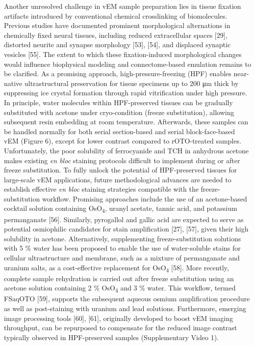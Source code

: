 \documentclass{article}
\begin{document}
Another unresolved challenge in vEM sample preparation lies in tissue fixation artifacts introduced by conventional chemical crosslinking of biomolecules. Previous studies have documented prominent morphological alternations in chemically fixed neural tissues, including reduced extracellular spaces [29], distorted neurite and synapse morphology [53], [54], and displaced synaptic vesicles [55]. The extent to which these fixation-induced morphological changes would influence biophysical modeling and connectome-based emulation remains to be clarified. As a promising approach, high-pressure-freezing (HPF) enables near-native ultrastructural preservation for tissue specimens up to 200 μm thick by suppressing ice crystal formation through rapid vitrification under high pressure. In principle, water molecules within HPF-preserved tissues can be gradually substituted with acetone under cryo-condition (freeze substitution), allowing subsequent resin embedding at room temperature. Afterwards, these samples can be handled normally for both serial section-based and serial block-face-based vEM (Figure 6), except for lower contrast compared to rOTO-treated samples. Unfortunately, the poor solubility of ferrocyanide and TCH in anhydrous acetone makes existing \emph{en bloc} staining protocols difficult to implement during or after freeze substitution. To fully unlock the potential of HPF-preserved tissues for large-scale vEM applications, future methodological advances are needed to establish effective \emph{en bloc} staining strategies compatible with the freeze-substitution workflow. Promising approaches include the use of an acetone-based cocktail solution containing OsO\textsubscript{4}, uranyl acetate, tannic acid, and potassium permanganate [56]. Similarly, pyrogallol and gallic acid are expected to serve as potential osmiophilic candidates for stain amplification [27], [57], given their high solubility in acetone. Alternatively, supplementing freeze-substitution solutions with 5 \% water has been proposed to enable the use of water-soluble stains for cellular ultrastructure and membrane, such as a mixture of permanganate and uranium salts, as a cost-effective replacement for OsO\textsubscript{4} [58]. More recently, complete sample rehydration is carried out after freeze substitution using an acetone solution containing 2 \% OsO\textsubscript{4} and 3 \% water. This workflow, termed FSaqOTO [59], supports the subsequent aqueous osmium amplification procedure as well as post-staining with uranium and lead solutions. Furthermore, emerging image processing tools [60], [61], originally developed to boost vEM imaging throughput, can be repurposed to compensate for the reduced image contrast typically observed in HPF-preserved samples (Supplementary Video 1).
\end{document}
